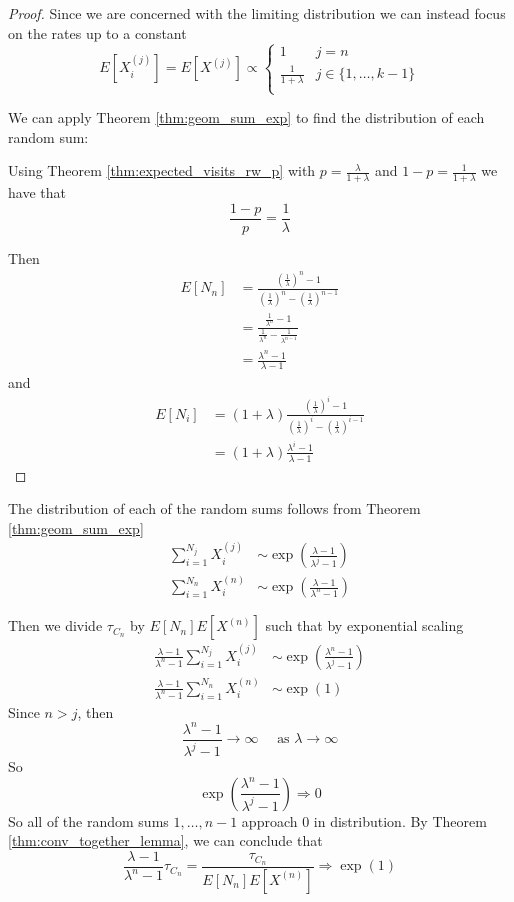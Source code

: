 \begin{proof}
Since we are concerned with the limiting distribution we can instead focus on the rates up to a constant
$$
E[X_i^{(j)}] = E[X^{(j)}] \propto \begin{cases}
  1 & j = n\\
  \frac{1}{1 + \lambda} & j \in \{1,\ldots, k - 1\}\\
\end{cases}
$$

We can apply Theorem \ref{thm:geom_sum_exp} to find the distribution of each random sum:

Using Theorem \ref{thm:expected_visits_rw_p} with $p = \frac{\lambda}{1 + \lambda}$ and $1 - p = \frac{1}{1 + \lambda}$ we have that
$$
\frac{1 - p}{p} = \frac{1}{\lambda}
$$

Then
\begin{align*}
    E[N_n] &= \frac{
        \left( \frac{1}{\lambda} \right)^{n} - 1
    }{
        \left( \frac{1}{\lambda} \right)^{n} - \left( \frac{1}{\lambda} \right)^{n - 1}
    }\\
    &= \frac{
        \frac{1}{\lambda^n} - 1
    }{
        \frac{1}{\lambda^n} - \frac{1}{\lambda^{n - 1}}
    }\\
    &= \frac{\lambda^n - 1}{\lambda - 1}
\end{align*}
and
\begin{align*}
E[N_i] &= (1 + \lambda) \frac{
        \left( \frac{1}{\lambda} \right)^{i} - 1
    }{
        \left( \frac{1}{\lambda} \right)^{i} - \left( \frac{1}{\lambda} \right)^{i - 1}
    }\\
    &= (1 + \lambda) \frac{\lambda^i - 1}{\lambda - 1}
\end{align*}
\end{proof}

The distribution of each of the random sums follows from Theorem \ref{thm:geom_sum_exp}
\begin{align*}
\sum_{i = 1}^{N_j} X_i^{(j)} &\sim \exp\left(
    \frac{\lambda - 1}{\lambda^j - 1} \right)\\
\sum_{i = 1}^{N_n} X_i^{(n)} &\sim \exp\left(
    \frac{\lambda - 1}{\lambda^n - 1}
\right)
\end{align*}

Then we divide $\tau_{C_n}$ by
$E[N_{n}]E[X^{(n)}]$ such that by exponential scaling
\begin{align*}
\frac{\lambda - 1}{\lambda^n - 1} \sum_{i = 1}^{N_j} X_i^{(j)} &\sim \exp\left(
    \frac{\lambda^n - 1}{\lambda^j - 1} \right)\\
\frac{\lambda - 1}{\lambda^n - 1} \sum_{i = 1}^{N_n} X_i^{(n)} &\sim \exp(1)
\end{align*}
Since $n > j$, then
$$
\frac{\lambda^n - 1}{\lambda^j - 1} \to \infty \quad \text{ as } \lambda \to \infty
$$
So
$$
\exp\left(
    \frac{\lambda^n - 1}{\lambda^j - 1}
\right) \Rightarrow 0
$$
So all of the random sums $1, \ldots, n - 1$ approach 0 in distribution.
By Theorem \ref{thm:conv_together_lemma}, we can conclude that
$$
\frac{\lambda - 1}{\lambda^n - 1} \tau_{C_n} = \frac{\tau_{C_n}}{E[N_{n}]E[X^{(n)}]} \Rightarrow \exp(1)
$$


